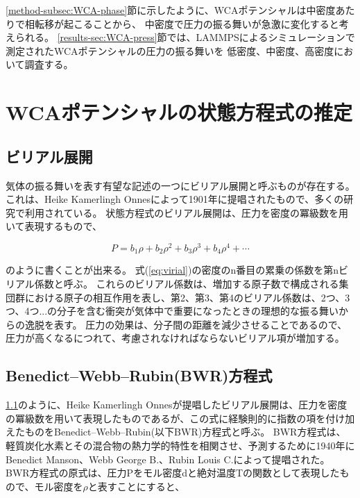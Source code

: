 \documentclass[titlepage]{jsreport}
\begin{document}
{{{\ref{method-subsec:WCA-phase}節に示したように、WCAポテンシャルは中密度あたりで相転移が起こることから、
中密度で圧力の振る舞いが急激に変化すると考えられる。
\ref{results-sec:WCA-press}節では、LAMMPSによるシミュレーションで測定されたWCAポテンシャルの圧力の振る舞いを
低密度、中密度、高密度において調査する。

\section{WCAポテンシャルの状態方程式の推定}\label{method-sec:WCA-equation}
\subsection{ビリアル展開}\label{method-subsec:virial}
気体の振る舞いを表す有望な記述の一つにビリアル展開と呼ぶものが存在する。
これは、Heike Kamerlingh Onnesによって1901年に提唱されたもの\cite{virial-Heike}で、多くの研究で利用されている。
状態方程式のビリアル展開は、圧力を密度の冪級数を用いて表現するもので、

\large
\begin{equation}
P=b_1{\rho}+b_2{\rho}^2+b_3{\rho}^3+b_4{\rho}^4+\cdots \label{eq:virial}
\end{equation}

\normalsize
のように書くことが出来る。
式(\ref{eq:virial})の密度のn番目の累乗の係数を第nビリアル係数と呼ぶ\cite{virial-expansion}。
これらのビリアル係数は、増加する原子数で構成される集団群における原子の相互作用を表し、第2、第3、第4のビリアル係数は、2つ、3つ、4つ...の分子を含む衝突が気体中で重要になったときの理想的な振る舞いからの逸脱を表す。
圧力の効果は、分子間の距離を減少させることであるので、圧力が高くなるにつれて、考慮されなければならないビリアル項が増加する\cite{virial-Heike}。

\subsection{Benedict–Webb–Rubin(BWR)方程式}\label{method-subsec:BWR}
\ref{method-subsec:virial}のように、Heike Kamerlingh Onnesが提唱したビリアル展開は、圧力を密度の冪級数を用いて表現したものであるが、この式に経験則的に指数の項を付け加えたものをBenedict–Webb–Rubin(以下BWR)方程式と呼ぶ。
BWR方程式は、軽質炭化水素とその混合物の熱力学的特性を相関させ、予測するために1940年にBenedict Manson、Webb George B.、Rubin Louis C.によって提唱された\cite{BWR-equation:original}。
BWR方程式の原式は、圧力Pをモル密度dと絶対温度Tの関数として表現したもので、モル密度を$\rho$と表すことにすると、

}}}
\end{document}
